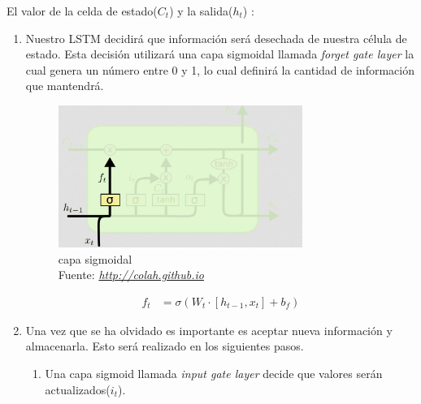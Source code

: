 El valor de la celda de estado($C_{t}$) y la salida($h_{t}$) :
\begin{enumerate}
	\item  Nuestro LSTM decidirá que información será desechada de nuestra célula de estado. Esta decisión utilizará una capa sigmoidal llamada \textit{forget gate layer} la cual genera un número entre 0 y 1, lo cual definirá la cantidad de información que mantendrá.
	\begin{figure}[H]
		\centering
		\includegraphics[width=0.75\textwidth]{Figures/forgetay.png}
		\caption{capa sigmoidal \\ Fuente:  \href{http://colah.github.io/posts/2015-08-Understanding-LSTMs/}{\textit{http://colah.github.io}}}
		\label{}
	\end{figure}
			\begin{equation}
				\label{forget layer}
				\begin{aligned}
				f_{t}&=\sigma(W_{t}\cdot[h_{t-1},x_{t}]+b_{f})
				\end{aligned}
			\end{equation}
	\item Una vez que se ha olvidado es importante es aceptar nueva información y almacenarla. Esto será realizado en los siguientes pasos.
	\begin{enumerate}
		\item Una capa sigmoid llamada \textit{input gate layer} decide que valores serán actualizados($i_{t}$).

	


\end{enumerate}
\end{enumerate}
